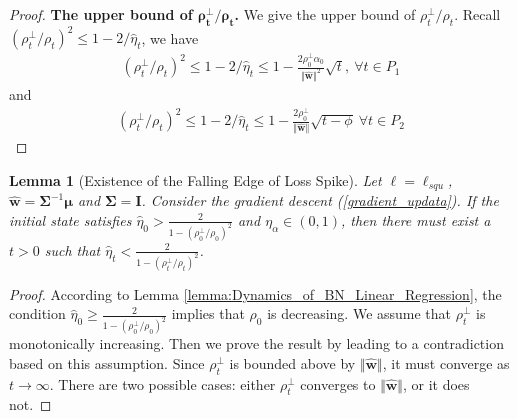 \documentclass[pdflatex,sn-basic]{sn-jnl}%
\theoremstyle{thmstyleone}%
\newtheorem{lemma}[theorem]{Lemma}
\begin{document}
\begin{appendices}
\begin{proof}
  \noindent\textbf{The upper bound of $\boldsymbol{\rho_t^{\perp} / \rho_t}$.}
  We give the upper bound of $\rho_t^{\perp} / \rho_t$. 
  Recall $(\rho_{t}^{\perp}/\rho_{t})^2 \le 1 - 2/\hat{\eta}_t$, we have 
  \begin{equation*}
  \begin{aligned}
    (\rho_{t}^{\perp}/\rho_{t})^2 
    \le 1 - 2/\hat{\eta}_t 
    \le 
    1 - 
    \frac{ 2 \rho_{0}^{\perp} \alpha_0}{\Vert \hat{\mathbf{w}} \Vert^2}
    \sqrt{t}, \  \forall t \in P_1
  \end{aligned}
  \end{equation*}
  and
  \begin{equation*}
  \begin{aligned}
    (\rho_{t}^{\perp}/\rho_{t})^2 
    \le 1 - 2/\hat{\eta}_t 
    \le 
    1 - 
    \frac{ 2 \rho_{0}^{\perp}}{
      \Vert \hat{\mathbf{w}} \Vert
    }
    \sqrt{t - \phi}
    \ \forall t \in P_2
  \end{aligned}
  \end{equation*} 
\end{proof}

\begin{shaded}
\begin{lemma}[Existence of the Falling Edge of Loss Spike]\label{Existence_of_Falling_Edge_lr}
  Let $\ell = \ell_{squ}$, $\hat{\mathbf{w}} = \mathbf{\Sigma}^{-1} \boldsymbol{\mu}$ and $\mathbf{\Sigma} = \mathbf{I}$. 
  Consider the gradient descent (\ref{gradient_updata}).
  If the initial state satisfies $\hat{\eta}_0 > \frac{2}{1 - \left(\rho_0^{\perp}/\rho_0 \right)^2}$ and $\eta_{\alpha} \in (0, 1)$, 
  then there must exist a $t > 0$ such that $\hat{\eta}_t < \frac{2}{1 - \left(\rho_t^{\perp}/\rho_t \right)^2}$.
\end{lemma}
\end{shaded}

\begin{proof}
  According to Lemma \ref{lemma:Dynamics_of_BN_Linear_Regression}, the condition 
  $\hat{\eta}_0 \ge \frac{2}{1 - ( {\rho_0^{\perp}}/{\rho_0} )^2}$ 
  implies that $\rho_0$ is decreasing. 
  We assume that $\rho_t^{\perp}$ is monotonically increasing.
  Then we prove the result by leading to a contradiction based on this assumption. 
  Since $\rho_t^{\perp}$ is bounded above by $\Vert \hat{\mathbf{w}} \Vert$, it must converge as $t \to \infty$. 
  There are two possible cases: either $\rho_t^{\perp}$ converges to $\Vert \hat{\mathbf{w}} \Vert$, or it does not. 


\end{proof}
\end{appendices}
\end{document}
